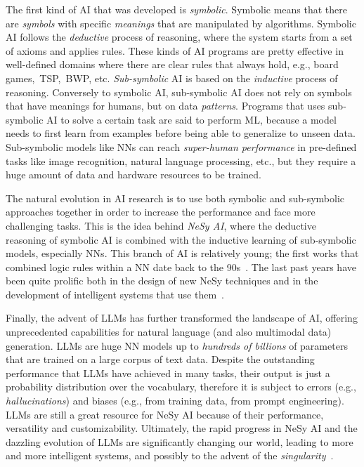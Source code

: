 \begin{refsection}
The first kind of \gls{AI} that was developed is \emph{symbolic}.
%
Symbolic means that there are \emph{symbols} with specific \emph{meanings} that are manipulated by algorithms.
%
Symbolic \gls{AI} follows the \emph{deductive} process of reasoning, where the system starts from a set of axioms and applies rules.
%
These kinds of \gls{AI} programs are pretty effective in well-defined domains where there are clear rules that always hold, e.g., board games,~\gls{TSP},~\gls{BWP}, etc.
%
\emph{Sub-symbolic} \gls{AI} is based on the \emph{inductive} process of reasoning.
%
Conversely to symbolic \gls{AI}, sub-symbolic \gls{AI} does not rely on symbols that have meanings for humans, but on data \emph{patterns}.
%
Programs that uses sub-symbolic \gls{AI} to solve a certain task are said to perform \gls{ML}, because a model needs to first learn from examples before being able to generalize to unseen data.
%
Sub-symbolic models like \glspl{NN} can reach \emph{super-human performance} in pre-defined tasks like image recognition, natural language processing, etc., but they require a huge amount of data and hardware resources to be trained.


The natural evolution in \gls{AI} research is to use both symbolic and sub-symbolic approaches together in order to increase the performance and face more challenging tasks.
%
This is the idea behind \emph{\gls{NeSy} \gls{AI}}, where the deductive reasoning of symbolic \gls{AI} is combined with the inductive learning of sub-symbolic models, especially \glspl{NN}.
%
This branch of \gls{AI} is relatively young; the first works that combined logic rules within a \gls{NN} date back to the 90s~\cite{DBLP:conf/aaai/TowellSN90,DBLP:journals/ai/TowellS94}.
%
The last past years have been quite prolific both in the design of new \gls{NeSy} techniques and in the development of intelligent systems that use them~\cite{DBLP:journals/csur/CiattoSAMO24}.


Finally, the advent of \glspl{LLM} has further transformed the landscape of \gls{AI}, offering unprecedented capabilities for natural language (and also multimodal data) generation.
%
\Glspl{LLM} are huge \gls{NN} models up to \emph{hundreds of billions} of parameters that are trained on a large corpus of text data.
%
Despite the outstanding performance that \glspl{LLM} have achieved in many tasks, their output is just a probability distribution over the vocabulary, therefore it is subject to errors (e.g., \emph{hallucinations}) and biases (e.g., from training data, from prompt engineering).
%
\Glspl{LLM} are still a great resource for \gls{NeSy} \gls{AI} because of their performance, versatility and customizability.
%
Ultimately, the rapid progress in \gls{NeSy} \gls{AI} and the dazzling evolution of \glspl{LLM} are significantly changing our world, leading to more and more intelligent systems, and possibly to the advent of the \emph{singularity}~\cite{shanahan2015technological}.



\end{refsection}
